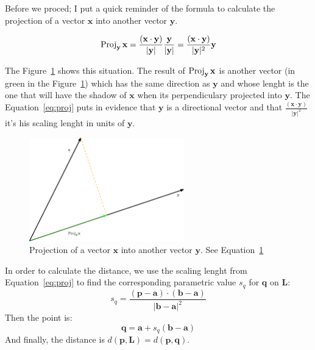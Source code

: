 Before we proced; I put a quick reminder of the formula to calculate the projection of a vector $\mathbf{x}$ into another vector $\mathbf{y}$. 

\begin{equation}
\operatorname{Proj}_{\mathbf{y}}\mathbf{x} = \dfrac{(\mathbf{x} \cdot \mathbf{y})}{|\mathbf{y}|} \dfrac{\mathbf{y}}{|\mathbf{y}|} = \dfrac{(\mathbf{x} \cdot \mathbf{y})}{|\mathbf{y}|^2}\mathbf{y}
\label{eq:proj}
\end{equation}

The Figure~\ref{fig:projection} shows this situation.
The result of $\operatorname{Proj}_{\mathbf{y}}\mathbf{x}$ is another vector (in green in the Figure~\ref{fig:projection}) which has the same direction as $\mathbf{y}$ and whose lenght is the one that will have the shadow of $\mathbf{x}$ when its perpendiculary projected into $\mathbf{y}$.
The Equation~\ref{eq:proj} puts in evidence that $\mathbf{y}$ is a directional vector and that $\frac{(\mathbf{x} \cdot \mathbf{y})}{|\mathbf{y}|^2}$ it's his scaling lenght in units of $\mathbf{y}$.

\begin{figure}[htb]
  \centering
  \includegraphics[width=0.60\textwidth]{img/projection}
  \caption{Projection of a vector $\mathbf{x}$ into another vector $\mathbf{y}$. See Equation~\ref{fig:projection}}
  \label{fig:projection}
\end{figure}

In order to calculate the distance, we use the scaling lenght from Equation~\ref{eq:proj} to find the corresponding parametric value $s_q$ for $\mathbf{q}$ on $\mathbf{L}$: 
\begin{equation}
s_q = \dfrac{(\mathbf{p} - \mathbf{a}) \cdot (\mathbf{b} - \mathbf{a})}{|\mathbf{b} - \mathbf{a}|^2}
\label{eq:scalarq}
\end{equation}
Then the point is:
\begin{equation}
\mathbf{q} = \mathbf{a} + s_q (\mathbf{b} -\mathbf{a})
\label{eq:pointq}
\end{equation}
And finally, the distance is $d(\mathbf{p}, \mathbf{L}) = d(\mathbf{p}, \mathbf{q})$.

